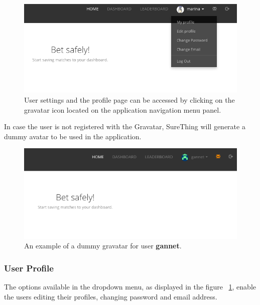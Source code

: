 \begin{figure}[H]
	\begin{center}
		\includegraphics[width=.90\columnwidth]{impl/images/gravatar}
		\caption{User settings and the profile page can be accessed by clicking on the gravatar icon located on the application navigation menu panel.} \label{fig:gravatar}
	\end{center}
\end{figure}

In case the user is not registered with the Gravatar, SureThing will generate a dummy avatar to be used in the application.

\begin{figure}[H]
	\begin{center}
		\includegraphics[width=.90\columnwidth]{impl/images/dummyGravatar}
		\caption{An example of a dummy gravatar for user \textbf{gannet}.} \label{fig:dummygravatar}
	\end{center}
\end{figure}

\subsubsection*{User Profile}
The options available in the dropdown menu, as displayed in the figure ~\ref{fig:gravatar}, enable the users editing their profiles, changing password and email address. 

